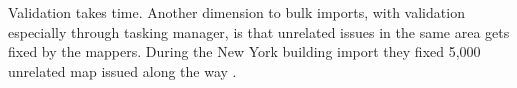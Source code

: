 Validation takes time. 
Another dimension to bulk imports, with validation especially through tasking manager, is that unrelated issues in the same area gets fixed by the mappers. During the New York building import they fixed 5,000 unrelated map issued along the way \cite{Barth2014}. 



 